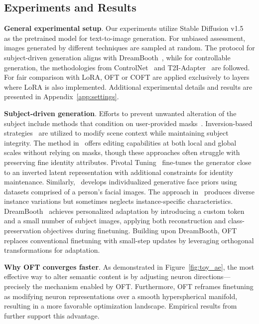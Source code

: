 \begin{itemize}[leftmargin=*,nosep]
\section{Experiments and Results}

\textbf{General experimental setup}. Our experiments utilize Stable Diffusion v1.5~\cite{rombach2022high} as the pretrained model for text-to-image generation. For unbiased assessment, images generated by different techniques are sampled at random. The protocol for subject-driven generation aligns with DreamBooth~\cite{ruiz2023dreambooth}, while for controllable generation, the methodologies from ControlNet~\cite{zhang2023adding} and T2I-Adapter~\cite{mou2023t2i} are followed. For fair comparison with LoRA, OFT or COFT are applied exclusively to layers where LoRA is also implemented. Additional experimental details and results are presented in Appendix~\ref{app:settings}.

\textbf{Subject-driven generation}. Efforts to prevent unwanted alteration of the subject include methods that condition on user-provided masks~\cite{avrahami2022blended,nichol2022glide}. Inversion-based strategies~\cite{choi2021ilvr,dhariwal2021diffusion,ramesh2022hierarchical,gal2022image} are utilized to modify scene context while maintaining subject integrity. The method in~\cite{hertz2022prompt} offers editing capabilities at both local and global scales without relying on masks, though these approaches often struggle with preserving fine identity attributes. Pivotal Tuning~\cite{roich2022pivotal} fine-tunes the generator close to an inverted latent representation with additional constraints for identity maintenance. Similarly,~\cite{nitzan2022mystyle} develops individualized generative face priors using datasets comprised of a person's facial images. The approach in~\cite{casanova2021instance} produces diverse instance variations but sometimes neglects instance-specific characteristics. DreamBooth~\cite{ruiz2023dreambooth} achieves personalized adaptation by introducing a custom token and a small number of subject images, applying both reconstruction and class-preservation objectives during finetuning. Building upon DreamBooth, OFT replaces conventional finetuning with small-step updates by leveraging orthogonal transformations for adaptation.



\textbf{Why OFT converges faster}. As demonstrated in Figure~\ref{fig:toy_ae}, the most effective way to alter semantic content is by adjusting neuron directions—precisely the mechanism enabled by OFT. Furthermore, OFT reframes finetuning as modifying neuron representations over a smooth hyperspherical manifold, resulting in a more favorable optimization landscape. Empirical results from \cite{liu2021orthogonal} further support this advantage.


\end{itemize}
